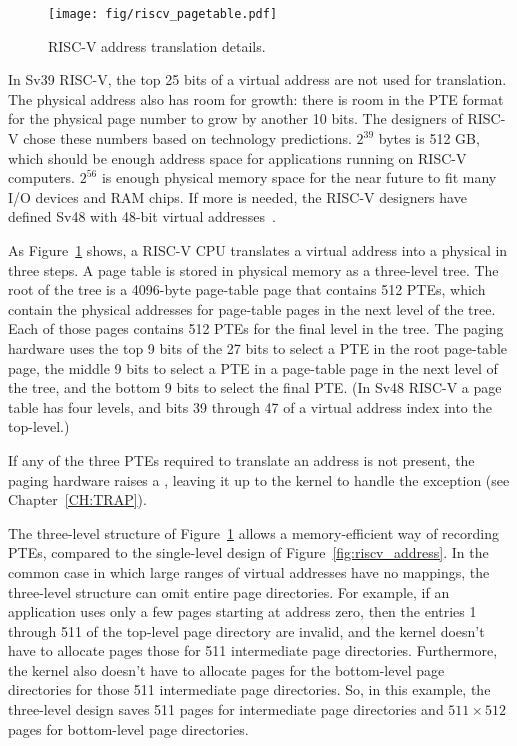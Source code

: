 \begin{figure}[t]
\center
\texttt{[image: fig/riscv\_pagetable.pdf]}
\caption{RISC-V address translation details.}
\label{fig:riscv_pagetable}
\end{figure}

In Sv39 RISC-V, the top 25 bits of a virtual address are not used for
translation. The physical address also has room for growth: there is
room in the PTE format for the physical page number to grow by another
10 bits.  The designers of RISC-V chose these numbers based on
technology predictions.  $2^{39}$ bytes is 512 GB, which should be
enough address space for applications running on RISC-V
computers. $2^{56}$ is enough physical memory space for the near
future to fit many I/O devices and RAM chips. If
more is needed, the RISC-V designers have defined Sv48 with 48-bit
virtual addresses~\cite{riscv:priv}.

As 
Figure~\ref{fig:riscv_pagetable} shows,
a RISC-V CPU translates a virtual address into a physical in
three steps.  A page table is stored
in physical memory as a three-level tree.
The root of the tree is a
4096-byte page-table page that contains 512 PTEs, which contain the physical
addresses for page-table pages in the next level of the tree.  Each of those
pages contains 512 PTEs for the final level in the tree.  The paging
hardware uses the top 9 bits of the 27 bits to select a PTE in the
root page-table page, the middle 9 bits to select a PTE in a page-table page in the
next level of the
tree, and the bottom 9 bits to select the final PTE.
(In Sv48 RISC-V a page table has four levels, and bits 39 through 47
of a virtual address index into the top-level.)

If any of the three PTEs required to translate an address
is not present, the paging hardware raises a , leaving it up
to the kernel to handle the exception (see Chapter~\ref{CH:TRAP}).

The three-level structure of Figure~\ref{fig:riscv_pagetable} allows a
memory-efficient way of recording PTEs, compared to the single-level
design of Figure~\ref{fig:riscv_address}.  In the common case in which
large ranges of virtual addresses have no mappings, the three-level
structure can omit entire page directories.  For example, if an
application uses only a few pages starting at address zero, then the
entries 1 through 511 of the top-level page directory are invalid, and
the kernel doesn't have to allocate pages those for 511 intermediate
page directories.  Furthermore, the kernel also doesn't have to
allocate pages for the bottom-level page directories for those 511
intermediate page directories. So, in this example, the three-level
design saves 511 pages for intermediate page directories and
$511\times512$ pages for bottom-level page directories.

